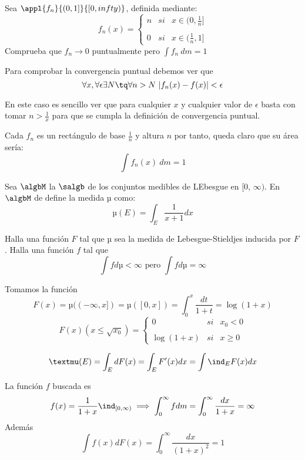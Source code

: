 \begin{problem}[11]
Sea $\appl{f_n}{(0,1]}{[0, infty)}$, definida mediante:
\[f_n(x)= \left\{ \begin{array}{lcc}
             n &   si  & x \in (0, \frac{1}{n}] \\
             \\ 0 &  si  & x \in (\frac{1}{n}, 1]
             \end{array}
   \right.\]
Comprueba que $f_n \rightarrow 0$ puntualmente pero $\int f_n \ dm = 1$

\solution

Para comprobar la convergencia puntual debemos ver que
\[\forall x, \forall \epsilon \exists N \tq \forall n > N \ |f_n(x)-f(x)| < \epsilon\]

En este caso es sencillo ver que para cualquier $x$ y cualquier valor de $\epsilon$ basta con tomar $n>\frac{1}{x}$ para que se cumpla la definición de convergencia puntual.

Cada $f_n$ es un rectángulo de base $\frac{1}{n}$ y altura $n$ por tanto, queda claro que su área sería:
\[\int f_n(x) \ dm= 1\]
\end{problem}

\begin{problem}[12]
Sea $\algbM$ la $\salgb$ de los conjuntos medibles de LEbesgue en [0, $\infty)$. En $\algbM$ de define la medida µ como:
\[µ(E) = \int_E \frac{1}{x+1} dx\]

Halla una función $F$ tal que µ sea la medida de Lebesgue-Stieldjes inducida por $F$. Halla una función $f$ tal que
\[\int f dµ < \infty \text{ pero } \int f dµ = \infty\]

\solution

Tomamos la función
\[F(x) = µ((-\infty, x]) = µ([0,x]) = \int_0^x \frac{dt}{1+t}=\log (1+x)\]
\[
F(x) (x \leq \sqrt{x_0})= \left\{ \begin{array}{lcc}
             0 & si & x_0 < 0 \\
             \\ \log(1+x) &  si & x \geq 0
             \end{array}
   \right.
\]

\obs \[µ(E) = \int_E dF(x) = \int_E F'(x) dx = \int \ind_E F(x) dx\]

La función $f$ buscada es
\[f(x) = \frac{1}{1+x}\ind_{[0, \infty)} \implies \int_0^{\infty} f dm = \int_0^{\infty} \frac{dx}{1+x} = \infty\]
Además
\[\int f(x) dF(x) = \int_0^{\infty} \frac{dx}{(1+x)^2} = 1\]

\end{problem}

